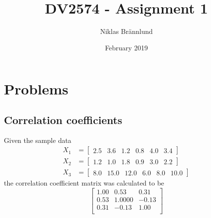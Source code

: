 \documentclass{article}
\title{DV2574 - Assignment 1}
\author{Niklas Brännlund}
\date{February 2019}
\begin{document}
\maketitle

\section{Problems}
\subsection{Correlation coefficients}
    Given the sample data
    \begin{equation}
        \begin{aligned}
            X_{1} & = 
            \begin{bmatrix}
               2.5 & 3.6 & 1.2 & 0.8 & 4.0 & 3.4
            \end{bmatrix} \\
            X_{2} & = 
            \begin{bmatrix}
               1.2 & 1.0 & 1.8 & 0.9 & 3.0 & 2.2
            \end{bmatrix}\\
            X_{3} & = 
            \begin{bmatrix}
           8.0 & 15.0 & 12.0 & 6.0 & 8.0 & 10.0
            \end{bmatrix}
        \end{aligned}
    \end{equation}
    the correlation coefficient matrix was calculated to be \\
    \begin{equation}
        \begin{bmatrix}
            1.00 & 0.53 & 0.31\\
            0.53 & 1.0000 & -0.13\\
            0.31 & -0.13 & 1.00\\
        \end{bmatrix}
    \end{equation}
\end{document}
